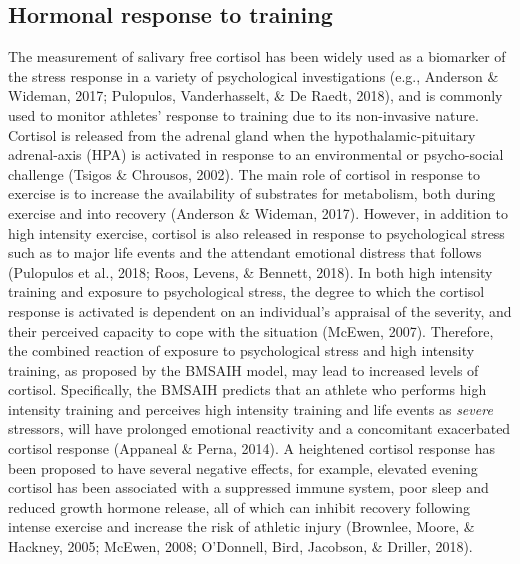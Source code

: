 \documentclass[man,floatsintext]{apa6}
\begin{document}
\hypertarget{hormonal-response-to-training}{%
\subsection{Hormonal response to training}\label{hormonal-response-to-training}}

The measurement of salivary free cortisol has been widely used as a biomarker of the stress response in a variety of psychological investigations (e.g., Anderson \& Wideman, 2017; Pulopulos, Vanderhasselt, \& De Raedt, 2018), and is commonly used to monitor athletes' response to training due to its non-invasive nature.
Cortisol is released from the adrenal gland when the hypothalamic-pituitary adrenal-axis (HPA) is activated in response to an environmental or psycho-social challenge (Tsigos \& Chrousos, 2002).
The main role of cortisol in response to exercise is to increase the availability of substrates for metabolism, both during exercise and into recovery (Anderson \& Wideman, 2017).
However, in addition to high intensity exercise, cortisol is also released in response to psychological stress such as to major life events and the attendant emotional distress that follows (Pulopulos et al., 2018; Roos, Levens, \& Bennett, 2018).
In both high intensity training and exposure to psychological stress, the degree to which the cortisol response is activated is dependent on an individual's appraisal of the severity, and their perceived capacity to cope with the situation (McEwen, 2007).
Therefore, the combined reaction of exposure to psychological stress and high intensity training, as proposed by the BMSAIH model, may lead to increased levels of cortisol.
Specifically, the BMSAIH predicts that an athlete who performs high intensity training and perceives high intensity training and life events as \emph{severe} stressors, will have prolonged emotional reactivity and a concomitant exacerbated cortisol response (Appaneal \& Perna, 2014).
A heightened cortisol response has been proposed to have several negative effects, for example, elevated evening cortisol has been associated with a suppressed immune system, poor sleep and reduced growth hormone release, all of which can inhibit recovery following intense exercise and increase the risk of athletic injury (Brownlee, Moore, \& Hackney, 2005; McEwen, 2008; O'Donnell, Bird, Jacobson, \& Driller, 2018).
\end{document}
